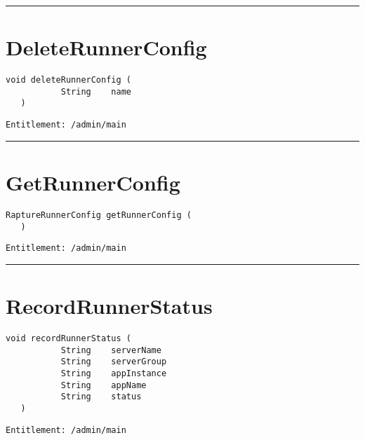 \rule{12cm}{2pt}
\section{DeleteRunnerConfig}
\label{Api:DeleteRunnerConfig}
\begin{lstlisting}[style=nonumbers]
   void deleteRunnerConfig (
           String    name
   )
\end{lstlisting}
\begin{Verbatim}[formatcom=\color{Maroon}]
  Entitlement: /admin/main
\end{Verbatim}



\rule{12cm}{2pt}
\section{GetRunnerConfig}
\label{Api:GetRunnerConfig}
\begin{lstlisting}[style=nonumbers]
   RaptureRunnerConfig getRunnerConfig (
   )
\end{lstlisting}
\begin{Verbatim}[formatcom=\color{Maroon}]
  Entitlement: /admin/main
\end{Verbatim}



\rule{12cm}{2pt}
\section{RecordRunnerStatus}
\label{Api:RecordRunnerStatus}
\begin{lstlisting}[style=nonumbers]
   void recordRunnerStatus (
           String    serverName
           String    serverGroup
           String    appInstance
           String    appName
           String    status
   )
\end{lstlisting}
\begin{Verbatim}[formatcom=\color{Maroon}]
  Entitlement: /admin/main
\end{Verbatim}



